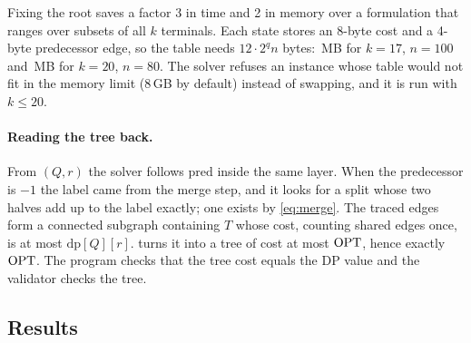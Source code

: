 \noindent Fixing the root saves a factor 3 in time and 2 in memory over a formulation that ranges over subsets of all \(k\)
terminals. Each state stores an 8-byte cost and a 4-byte predecessor edge, so the table needs \(12\cdot2^{q}n\) bytes:
\,MB for \(k=17\), \(n=100\) and \,MB for \(k=20\), \(n=80\). The solver refuses an instance whose
table would not fit in the memory limit (8\,GB by default) instead of swapping, and it is run with \(k\le20\).

\paragraph{Reading the tree back.} From \((Q,r)\) the solver follows \(\mathrm{pred}\) inside the same layer. When the
predecessor is \(-1\) the label came from the merge step, and it looks for a split whose two halves add up to the label exactly; one
exists by \eqref{eq:merge}. The traced edges form a connected subgraph containing \(T\) whose cost, counting shared edges once, is at
most \(\mathrm{dp}[Q][r]\).  turns it into a tree of cost at most \(\mathrm{OPT}\), hence exactly \(\mathrm{OPT}\). The program checks
that the tree cost equals the DP value and the validator checks the tree.

\subsection{Results}

